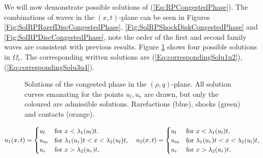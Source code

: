 \documentclass[10pt]{article}
\numberwithin{equation}{section}
\begin{document}
We will now demonstrate possible solutions of (\ref{Eq:RPCongestedPhase}). The combinations of waves in the $(x,t)$-plane can be seen in Figures \ref{Fig:SolRPRarefDiscCongestedPhase}, \ref{Fig:SolRPShockDiskCongestedPhase} and \ref{Fig:SolRPDiscCongestedPhase}, note the order of the first and second family waves are consistent with previous results. Figure \ref{fig:SolRPCongInRhoQ} shows four possible solutions in $\Omega_c$. The corresponding written solutions are (\ref{Eq:correspondingSolu1u2}), (\ref{Eq:correspondingSolu3u4}). 
\begin{figure}
    \centering
    
    \caption{Solutions of the congested phase in the $(\rho,q)$-plane. All solution curves emanating for the points $u_l, u_r$ are drawn, but only the coloured are admissible solutions. Rarefactions (blue), shocks (green) and contacts (orange). }
    \label{fig:SolRPCongInRhoQ}
\end{figure}
\begin{align}
    u_1(x,t) = \begin{cases} 
    u_l & \text{for  $x < \lambda_1(u_l)t$},\\
    u_m & \text{for $\lambda_1(u_r)t < x < \lambda_2(u_l)t$}, \\
    u_r & \text{for $ x > \lambda_2(u_r)t$}, \\
    \end{cases} \quad
    u_2(x,t) = \begin{cases}
    u_l & \text{for $ x < \lambda_1(u_l)t$},\\
    u_m & \text{for $ \lambda_1(u_r)t < x < \lambda_2(u_l)t$}, \\
    u_r & \text{for $ x > \lambda_2(u_r)t$}, \\
    \end{cases}
    \label{Eq:correspondingSolu1u2}
\end{align}
\end{document}
